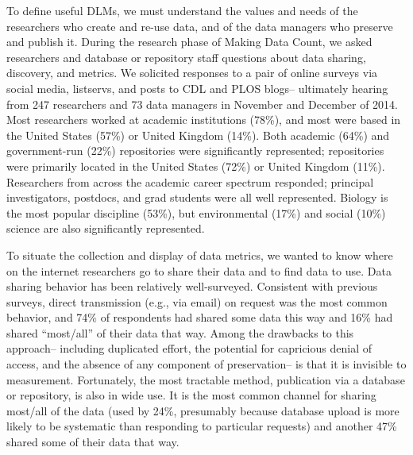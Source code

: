 \documentclass[english]{article}
\begin{document}

To define useful DLMs, we must understand the values and needs of the researchers who create and re-use data, and of the data managers who preserve and publish it.
During the research phase of Making Data Count, we asked researchers and database or repository staff questions about data sharing, discovery, and metrics.
We solicited responses to a pair of online surveys via social media, listservs, and posts to CDL and PLOS blogs-- ultimately hearing from 247 researchers and 73 data managers in November and December of 2014.
Most researchers worked at academic institutions (78\%), and most were based in the United States (57\%) or United Kingdom (14\%).
Both academic (64\%) and government-run (22\%) repositories were significantly represented; repositories were primarily located in the United States (72\%) or United Kingdom (11\%).
Researchers from across the academic career spectrum responded; principal investigators, postdocs, and grad students were all well represented. 
Biology is the most popular discipline (53\%), but environmental (17\%) and social (10\%) science are also significantly represented. 


To situate the collection and display of data metrics, we wanted to know where on the internet researchers go to share their data and to find data to use. 
Data sharing behavior has been relatively well-surveyed\cite{@tenopir_data_2011, @akers_disciplinary_2013, @wallis_if_2013, @aydinoglu_data_2014, @kratz_researcher_2015}. 
Consistent with previous surveys, direct transmission (e.g., via email) on request was the most common behavior, and 74\% of respondents had shared some data this way and 16\% had shared ``most/all'' of their data that way.
Among the drawbacks to this approach-- including duplicated effort, the potential for capricious denial of access, and the absence of any component of preservation-- is that it is invisible to measurement. 
Fortunately, the most tractable method, publication via a database or repository, is also in wide use.
It is the most common channel for sharing most/all of the data (used by 24\%, presumably because database upload is more likely to be systematic than responding to particular requests) and another 47\% shared some of their data that way.
\end{document}
